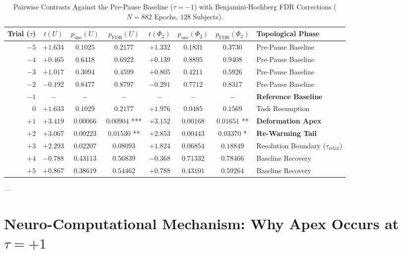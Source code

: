 \documentclass[11pt,twoside,a4paper]{article}
\begin{document}
\begin{table}[H]
\centering
\caption{Pairwise Contrasts Against the Pre-Pause Baseline ($\tau = -1$) with Benjamini-Hochberg FDR Corrections ($N=882$ Epochs, $128$ Subjects).}
\label{tab:fdr_contrasts}
\vspace{0.4em}
\small
\begin{tabular}{r c c c c c c l}
\toprule
\textbf{Trial ($\tau$)} & \textbf{$t(U)$} & \textbf{$p_{\text{unc}}(U)$} & \textbf{$p_{\text{FDR}}(U)$} & \textbf{$t(\Phi_2)$} & \textbf{$p_{\text{unc}}(\Phi_2)$} & \textbf{$p_{\text{FDR}}(\Phi_2)$} & \textbf{Topological Phase} \\
\midrule
$-5$ & $+1.634$ & $0.1025$ & $0.2177$ & $+1.332$ & $0.1831$ & $0.3730$ & Pre-Pause Baseline \\
$-4$ & $+0.465$ & $0.6418$ & $0.6922$ & $+0.139$ & $0.8895$ & $0.9408$ & Pre-Pause Baseline \\
$-3$ & $+1.017$ & $0.3094$ & $0.4599$ & $+0.805$ & $0.4211$ & $0.5926$ & Pre-Pause Baseline \\
$-2$ & $-0.192$ & $0.8477$ & $0.8797$ & $-0.291$ & $0.7712$ & $0.8317$ & Pre-Pause Baseline \\
\textbf{$-1$} & \textbf{--} & \textbf{--} & \textbf{--} & \textbf{--} & \textbf{--} & \textbf{--} & \textbf{Reference Baseline} \\
$0$ & $+1.633$ & $0.1029$ & $0.2177$ & $+1.976$ & $0.0485$ & $0.1569$ & Task Resumption \\
\textbf{$+1$} & $\mathbf{+3.419}$ & $\mathbf{0.00066}$ & $\mathbf{0.00904}$ *** & $\mathbf{+3.152}$ & $\mathbf{0.00168}$ & $\mathbf{0.01651}$ ** & \textbf{Deformation Apex} \\
\textbf{$+2$} & $\mathbf{+3.067}$ & $\mathbf{0.00223}$ & $\mathbf{0.01530}$ ** & $\mathbf{+2.853}$ & $\mathbf{0.00443}$ & $\mathbf{0.03370}$ * & \textbf{Re-Warming Tail} \\
$+3$ & $+2.293$ & $0.02207$ & $0.08093$ & $+1.824$ & $0.06854$ & $0.18849$ & Resolution Boundary ($\tau_{\text{relax}}$) \\
$+4$ & $-0.788$ & $0.43113$ & $0.56839$ & $-0.368$ & $0.71332$ & $0.78466$ & Baseline Recovery \\
$+5$ & $+0.867$ & $0.38619$ & $0.54462$ & $+0.788$ & $0.43101$ & $0.59264$ & Baseline Recovery \\
\bottomrule
\end{tabular}
\end{table}

---

\section{Neuro-Computational Mechanism: Why Apex Occurs at $\tau = +1$}
\end{document}
